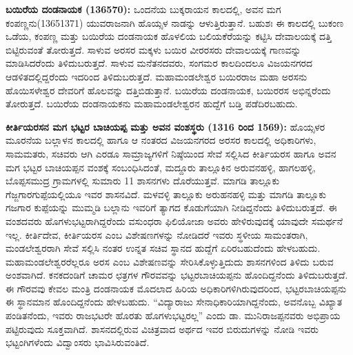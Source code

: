 \textbf{ಬಯಿರೆಯ ದಂಡನಾಯಕ (1365\general{\enginline{-}}70):} ಒಂದನೆಯ ಬುಕ್ಕರಾಯನ ಕಾಲದಲ್ಲಿ, ಅವನ ಮಗ ಕಂಪಣ್ಣನು(1365\enginline{-}1371) ಯುವರಾಜನಾಗಿ ಹೊಯ್ಸಳ ನಾಡನ್ನು ಆಳುತ್ತಿರುತ್ತಾನೆ. ಬಹುಶಃ ಈ ಕಾಲದಲ್ಲಿ ಬುಕಂಣ ಒಡೆಯ, ಕಂಪಣ್ಣ ಮತ್ತು ಬಯಿರೆಯ ದಂಡನಾಯಕ ಹೊಳಲಿಯ ಬಲಿಯಕೆರೆಯನ್ನು ಕಟ್ಟಿಸಿ ದೇವಾಲಯಕ್ಕೆ ದತ್ತಿ ಬಿಟ್ಟಿರುವಂತೆ ತೋರುತ್ತದೆ. ಸಾಳುವ ಅರಸರ ಮಕ್ಕಳು ಬಯಿರ ವೀರರಸರು ದೇವಾಲಯಕ್ಕೆ ಗಾಣವನ್ನು ಮಾಡಿಸಿದರೆಂದು ತಿಳಿದುಬರುತ್ತದೆ. ಸಾಳುವ ಮನೆತನದವರು, ಸಂಗಮರ ಕಾಲದಿಂದಲೂ ವಿಜಯನಗರದ ಆಡಳಿತದಲ್ಲಿದ್ದರೆಂದು ಇದರಿಂದ ತಿಳಿದುಬರುತ್ತದೆ. ಮಹಾಮಂಡಲೇಶ್ವರ ಬಯಿರರಾಜ ಮಹಾ ಅರಸನು ಹೊಯಿಸಳೇಶ್ವರ ದೇವರಿಗೆ ಹೊಲವನ್ನು ದತ್ತಿಬಿಡುತ್ತಾನೆ. ಬಯಿರೆಯ ದಂಡನಾಯಕ, ಬಯಿರರಸ ಅಭಿನ್ನರೆಂದು ತೋರುತ್ತದೆ. ಬಯಿರೆಯ ದಂಡನಾಯಕನು ಮಹಾಮಂಡಲೇಶ್ವರನ ಹುದ್ದೆಗೆ ಬಡ್ತಿ ಪಡೆದಿರಬಹುದು.

\textbf{ಕೀರ್ತಿಯರಸನ ಮಗ ಭಟ್ಟರ ಬಾಚಿಯಪ್ಪ ಮತ್ತು ಅವನ ವಂಶಸ್ಥರು (1316 ರಿಂದ 1569):} ಹೊಯ್ಸಳರ ಮೂರನೆಯ ಬಲ್ಲಾಳನ ಕಾಲದಲ್ಲಿ ಹಾಗೂ ಆ ನಂತರದ ವಿಜಯನಗರದ ಅರಸರ ಕಾಲದಲ್ಲಿ ಅಧಿಕಾರಿಗಳು, ಸಾಮಮತರು, ಸಚಿವರು ಆಗಿ ಎರಡೂ ಸಾಮ್ರಾಜ್ಯಗಳಿಗೆ ನಿಷ್ಠೆಯಿಂದ ಸೇವೆ ಸಲ್ಲಿಸಿದ ಕೀರ್ತಿಯರಸ ಹಾಗೂ ಅವನ ಮಗ ಭಟ್ಟರ ಬಾಚಿಯಪ್ಪನ ವಂಶಕ್ಕೆ ಸಂಬಂಧಿಸಿದಂತೆ, ಮದ್ದೂರು ತಾಲ್ಲೂಕಿನ ಅರುವನಹಳ್ಳಿ, ಹಾಗಲಹಳ್ಳಿ, ಬೊಪ್ಪಸಮುದ್ರ ಗ್ರಾಮಗಳಲ್ಲಿ ಸುಮಾರು 11 ಶಾಸನಗಳು ದೊರೆಯುತ್ತವೆ. ಮಾಗಡಿ ತಾಲ್ಲೂಕು ಗೆಜ್ಜಗಾರಗುಪ್ಪೆಯಲ್ಲಿಯೂ ಇವರ ಶಾಸನವಿದೆ. ಮಳವಳ್ಳಿ ತಾಲ್ಲೂಕು ಅರುಹನಹಳ್ಳಿ ಮತ್ತು ಮಾಗಡಿ ತಾಲ್ಲೂಕು ಗಜಗಾರ ಕುಪ್ಪೆಯನ್ನು ಮುಮ್ಮಡಿ ಬಲ್ಲಾನು ಇವರಿಗೆ ತ್ಯಾಗದ ಕೊಡುಗೆಯಾಗಿ ನೀಡಿದ್ದನೆಂದು ತಿಳಿದುಬರುತ್ತದೆ. ಈ ವಂಶದವರು ಹೊಗಳುಭಟ್ಟರಾಗಿದ್ದರೆಂದು ವಸುಂಧರಾ ಫಿಲಿಯೋಜಾ ಅವರು ಹೇಳಿರುವುದಕ್ಕೆ ಯಾವುದೇ ಸಮರ್ಥನೆ ಇಲ್ಲ. ಕೀರ್ತಿದೇವ, ಕೀರ್ತಿಯರಸ ಎಂಬ ವಿಶೇಷಣಗಳನ್ನು ನೋಡಿದರೆ ಇವರು ಸ್ಥಳೀಯ ಸಾಮಂತರಾಗಿ, ಮಂಡಲೇಶ್ವರರಾಗಿ ಸೇವೆ ಸಲ್ಲಿಸಿ ನಂತರ ಉನ್ನತ ಸಚಿವ ಸ್ಥಾನದ ಹುದ್ದೆಗೆ ಏರಿರಬಹುದೆಂದು ಹೇಳಬಹುದು. ಮಹಾಮಂಡಲೇಶ್ವರರೆಲ್ಲರೂ ಅರಸ ಎಂಬ ವಿಶೇಷಣವನ್ನು ಸೇರಿಸಿಕೊಳ್ಳುತ್ತಿದುದು ಶಾಸನಗಳಿಂದ ತಿಳಿದು ಬರುವ ಅಂಶವಾಗಿದೆ. ಕನಕದಂಡಿಗೆ ಚಾಮರ ಛತ್ರಗಳ ಗೌರವವನ್ನು ಭಟ್ಟರಬಾಚಿಯಪ್ಪನು ಹೊಂದಿದ್ದನೆಂದು ತಿಳಿದುಬರುತ್ತದೆ. ಈ ಗೌರವವು ಕೇವಲ ಮಂತ್ರಿ ದಂಡನಾಯಕ ಮೊದಲಾದ ಹಿರಿಯ ಅಧಿಕಾರಿಗಳಿಗಿರು\-ವುದರಿಂದ, ಭಟ್ಟರಬಾಚಿಯಪ್ಪನು ಈ ಸ್ಥಾನಮಾನ ಹೊಂದಿದ್ದನೆಂದು ಹೇಳಬಹುದು. “ವಿದ್ಯಾರಾಜು ಸೇನಾಧಿಕಾರಿಯಾಗಿದ್ದ\-ನೆಂದು, ಅವನೊಬ್ಬ ವಿಖ್ಯಾತ ಪಂಡಿತನೆಂದು, ಇವರು ರಾಜಭಟರೇ ಹೊರತು ಹೊಗಳುಭಟ್ಟರಲ್ಲ” ಎಂದು ಡಾ. ಮುನಿರಾಜಪ್ಪ\-ನವರು ಅಭಿಪ್ರಾಯ ಪಟ್ಟಿರುವುದು ಸೂಕ್ತವಾಗಿದೆ. ಶಾಸನದಲ್ಲಿರುವ ವಿಚಿತ್ರವಾದ ಅರ್ಥದ ಇವರ ಬಿರುದುಗಳನ್ನು ನೋಡಿ ಇವರು ಭಟ್ಟಂಗಿಗಳೆಂದು ವಿದ್ವಾಂಸರು ಭಾವಿಸಿರುವಂತಿದೆ.

